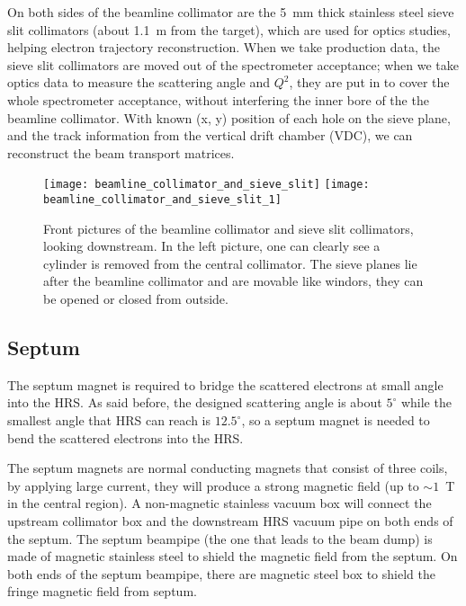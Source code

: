 On both sides of the beamline collimator are the 5~mm thick stainless steel
sieve slit collimators (about 1.1~m from the target), which    %
are used for optics studies, helping electron trajectory reconstruction. When
we take production data, the sieve slit collimators are moved out of the spectrometer
acceptance; when we take optics data to measure the scattering angle and $Q^2$,
they are put in to cover the whole spectrometer acceptance,
without interfering the inner bore of the the beamline collimator. With known
(x, y) position of each hole on the sieve plane, and the track information from 
the vertical drift chamber (VDC), we can reconstruct the beam transport matrices.
\begin{figure}[!h]
    \centering
    \texttt{[image: beamline\_collimator\_and\_sieve\_slit]}
    \hspace{1cm}
    \texttt{[image: beamline\_collimator\_and\_sieve\_slit\_1]}
    \caption{Front pictures of the beamline collimator and sieve slit collimators, looking 
    downstream. In the left picture, one can clearly see a cylinder is removed 
    from the central collimator.
    The sieve planes lie after the beamline collimator and are movable like
    windors, they can be opened or closed from outside.}
\end{figure}

\subsection{Septum}
The septum magnet is required to bridge the scattered electrons at small angle
into the HRS. As said before, the designed scattering angle is about $5^\circ$
while the smallest angle that HRS can reach is $12.5^\circ$, so a septum magnet 
is needed to bend the scattered electrons into the HRS. 

The septum magnets are normal conducting magnets that consist of three coils, 
by applying large current, they will produce a
strong magnetic field (up to $\sim 1$~T in the central region). A non-magnetic
stainless vacuum box will connect the upstream collimator box and the downstream 
HRS vacuum pipe on both ends of the septum. The septum beampipe (the one that
leads to the beam dump) is made of magnetic stainless steel to shield the
magnetic field from the septum. On both ends of the septum beampipe, there
are magnetic steel box to shield the fringe magnetic field from septum. 

